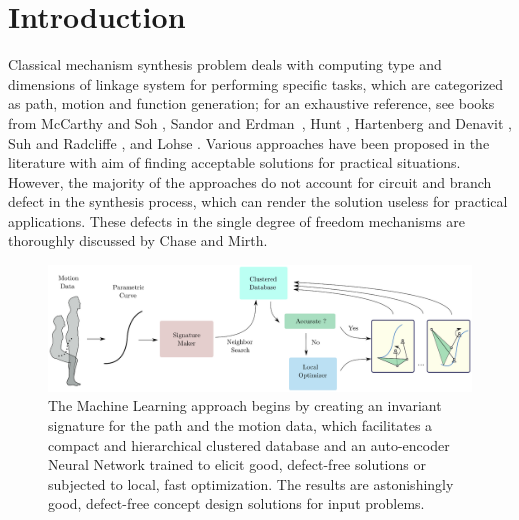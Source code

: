 \documentclass[twocolumn,10pt]{asme2e}
\begin{document}
\section{Introduction}
Classical mechanism synthesis problem deals with computing type and dimensions of linkage system for performing specific tasks, which are categorized as path, motion and function generation; for an exhaustive reference, see books from McCarthy and Soh \cite{sohmccarthy}, Sandor and Erdman~\cite{Sandor}, Hunt \cite{Hunt78}, Hartenberg and Denavit \cite{Hartenberg},  Suh and Radcliffe \cite{Suh78}, and Lohse \cite{lohse2013}.
Various approaches have been proposed in the literature with aim of finding acceptable solutions for practical situations.
However, the majority of the approaches do not account for circuit and branch defect in the synthesis process, which can render the solution useless for practical applications.
These defects in the single degree of freedom mechanisms are thoroughly discussed by Chase and Mirth\cite{chasemirth}.

\begin{figure}
\centering
\includegraphics[width=\textwidth]{figure/overall_approach.eps}
  \caption{The Machine Learning approach begins by creating an invariant signature for the path and the motion data, which facilitates a compact and hierarchical clustered database and an auto-encoder Neural Network trained to elicit good, defect-free solutions or subjected to local, fast optimization. The results are astonishingly good, defect-free concept design solutions for input problems.}
\label{overallMethod}
\end{figure}
\end{document}
